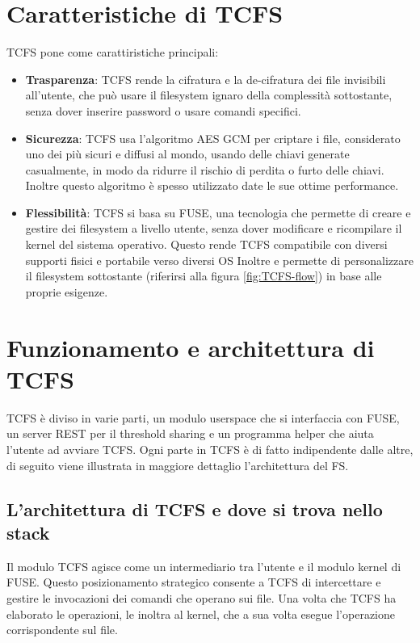 \section{Caratteristiche di TCFS}
TCFS pone come carattiristiche principali:
\begin{itemize}
    \item \textbf{Trasparenza}: TCFS rende la cifratura e la de-cifratura dei file invisibili all’utente, che può usare il filesystem ignaro della complessità sottostante, senza dover inserire password o usare comandi specifici.
    \item \textbf{Sicurezza}: TCFS usa l’algoritmo AES GCM per criptare i file, considerato uno dei più sicuri e diffusi al mondo, usando delle chiavi generate casualmente, in modo da ridurre il rischio di perdita o furto delle chiavi. Inoltre questo algoritmo è spesso utilizzato date le sue ottime performance.
    \item \textbf{Flessibilità}: TCFS si basa su FUSE, una tecnologia che permette di creare e gestire dei filesystem a livello utente, senza dover modificare e ricompilare il kernel del sistema operativo. Questo rende TCFS compatibile con diversi supporti fisici e portabile verso diversi OS Inoltre e permette di personalizzare il filesystem sottostante (riferirsi alla figura \ref{fig:TCFS-flow}) in base alle proprie esigenze. 
\end{itemize}

\section{Funzionamento e architettura di TCFS} 
TCFS è diviso in varie parti, un modulo userspace che si interfaccia con FUSE, un server REST per il threshold sharing e un programma helper che aiuta l'utente ad avviare TCFS. Ogni parte in TCFS è di fatto indipendente dalle altre, di seguito viene illustrata in maggiore dettaglio l'architettura del FS.

\subsection{L'architettura di TCFS e dove si trova nello stack} 
Il modulo TCFS agisce come un intermediario tra l’utente e il modulo kernel di FUSE. Questo posizionamento strategico consente a TCFS di intercettare e gestire le invocazioni dei comandi che operano sui file. Una volta che TCFS ha elaborato le operazioni, le inoltra al kernel, che a sua volta esegue l’operazione corrispondente sul file.

